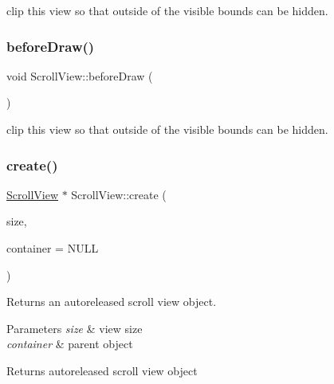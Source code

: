 clip this view so that outside of the visible bounds can be hidden. \mbox{\label{classScrollView_a4576d3e279850eb6f31c1fa48aeb8d6e}} 
\subsubsection{\texorpdfstring{before\+Draw()}{beforeDraw()}\hspace{0.1cm}{\footnotesize\ttfamily [2/2]}}
{\footnotesize\ttfamily void Scroll\+View\+::before\+Draw (\begin{DoxyParamCaption}{ }\end{DoxyParamCaption})\hspace{0.3cm}{\ttfamily [protected]}}

clip this view so that outside of the visible bounds can be hidden. \mbox{\label{classScrollView_a1442b0e45ca34a346264d4eaaf3306a4}} 
\subsubsection{\texorpdfstring{create()}{create()}\hspace{0.1cm}{\footnotesize\ttfamily [1/4]}}
{\footnotesize\ttfamily \hyperlink{classScrollView}{Scroll\+View} $\ast$ Scroll\+View\+::create (\begin{DoxyParamCaption}\item[{\hyperlink{classSize}{Size}}]{size,  }\item[{\hyperlink{classNode}{Node} $\ast$}]{container = {\ttfamily NULL} }\end{DoxyParamCaption})\hspace{0.3cm}{\ttfamily [static]}}

Returns an autoreleased scroll view object.


\begin{DoxyParams}{Parameters}
{\em size} & view size \\
\hline
{\em container} & parent object \\
\hline
\end{DoxyParams}
\begin{DoxyReturn}{Returns}
autoreleased scroll view object 
\end{DoxyReturn}
\mbox{\label{classScrollView_adca37a2f6083dacfab480417e517e3d6}} 

